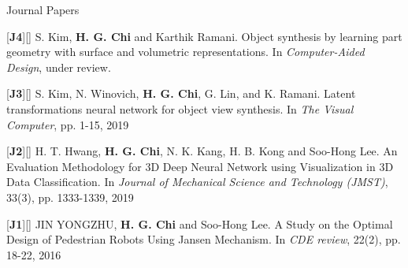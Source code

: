 


\begin{cventries}

\cvpub
{Journal Papers} %
{ %
\begin{cvitems}
\item {[\textbf{J4}][\href{https://docs.google.com/viewer?url=https://github.com/stnoah1/CV/raw/master/documents/CAD.pdf}{}] S. Kim, \textbf{H. G. Chi} and Karthik Ramani. Object synthesis by learning part geometry with surface and volumetric representations. In \textit{Computer-Aided Design}, under review.}
\item {[\textbf{J3}][\href{https://link.springer.com/article/10.1007/s00371-019-01755-x}{}] S. Kim, N. Winovich, \textbf{H. G. Chi}, G. Lin, and K. Ramani. Latent transformations neural network for object view synthesis. In \textit{The Visual Computer}, pp. 1-15, 2019}
\item {[\textbf{J2}][\href{https://link.springer.com/content/pdf/10.1007/s12206-019-0233-1.pdf}{}] H. T. Hwang, \textbf{H. G. Chi}, N. K. Kang, H. B. Kong and Soo-Hong Lee. An Evaluation Methodology for 3D Deep Neural Network using Visualization in 3D Data Classification. In \textit{Journal of Mechanical Science and Technology (JMST)}, 33(3), pp. 1333-1339, 2019}
\item {[\textbf{J1}][\href{https://docs.google.com/viewer?url=https://github.com/stnoah1/CV/raw/master/documents/Edison.pdf}{}] JIN YONGZHU, \textbf{H. G. Chi} and Soo-Hong Lee. A Study on the Optimal Design of Pedestrian Robots Using Jansen Mechanism. In \textit{CDE review}, 22(2), pp. 18-22, 2016}
\end{cvitems}
}


\end{cventries}
